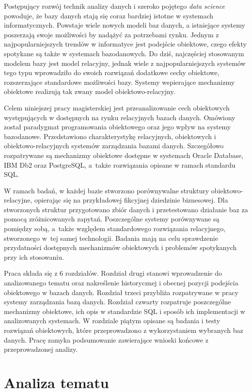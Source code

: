 \documentclass[a4paper,twoside,12pt]{book}
\begin{document}
Postępujący rozwój technik analizy danych i szeroko pojętego \textit{data science} powoduje, że bazy danych stają się coraz bardziej istotne w systemach informatycznych. Powstaje wiele nowych modeli baz danych, a istniejące systemy poszerzają swoje możliwości by nadążyć za potrzebami rynku. Jednym z najpopularniejszych trendów w informatyce jest podejście obiektowe, czego efekty spotykane są także w systemach bazodanowych. Do dziś, najczęściej stosowanym modelem bazy jest model relacyjny, jednak wiele z najpopularniejszych systemów tego typu wprowadziło do swoich rozwiązań dodatkowe cechy obiektowe, rozszerzające standardowe możliwości bazy. Systemy wspierające mechanizmy obiektowe realizują tak zwany model obiektowo-relacyjny.

Celem niniejszej pracy magisterskiej jest przeanalizowanie cech obiektowych występujących w dostępnych na rynku relacyjnych bazach danych. Omówiony został paradygmat programowania obiektowego oraz jego wpływ na systemy bazodanowe. Przedstawiono charakterystykę relacyjnych, obiektowych i obiektowo-relacyjnych systemów zarządzania bazami danych. Szczegółowo rozpatrywane są mechanizmy obiektowe dostępne w systemach Oracle Database, IBM Db2 oraz PostgreSQL, a~także rozwiązania opisane w ramach standardu SQL.

W ramach badań, w każdej bazie stworzono porównywalne struktury obiektowo-relacyjne, opierając się na przykładowej fikcyjnej dziedzinie biznesowej. Dla stworzonych struktur przygotowano zbiór danych i przetestowano działanie baz za pomocą zróżnicowanych zapytań. Poszczególne systemy porównywane są pomiędzy sobą, a~także względem standardowego rozwiązania relacyjnego, stworzonego w~tej samej technologii. Badania mają na celu sprawdzenie przydatności dostępnych mechanizmów obiektowych i problemów spotykanych przy ich stosowaniu.

Praca składa się z 6 rozdziałów. Rozdział drugi stanowi wprowadzenie do analizowanego tematu oraz nakreślenie historycznej i obecnej pozycji podejścia obiektowego w bazach danych. Rozdział trzeci przybliża rozpatrywane w pracy systemy zarządzania bazą danych. Rozdział czwarty rozpatruje poszczególne mechanizmy obiektowe, ich opis w standardzie SQL i sposób ich implementacji w analizowanych systemach. W rozdziale piątym opisane są badania i testy rozwiązań obiektowych, które przeprowadzono z wykorzystaniem wybranych baz danych. Pracę zamyka podsumowanie zawierające wnioski końcowe z przeprowadzonej analizy.

\chapter{Analiza tematu}
\end{document}
